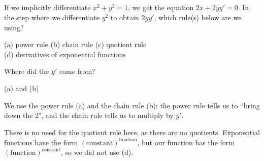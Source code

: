 %
%



\subsection*{\Conceptual}


\begin{question}
If we implicitly differentiate $x^2+y^2=1$, we get the equation $2x+2yy'=0$. In the step where we differentiate $y^2$ to obtain $2yy'$, which rule(s) below are we using?
\begin{center}
(a) power rule \qquad (b) chain rule \qquad
 (c) quotient rule \\(d) derivatives of exponential functions
\end{center}
\end{question}
\begin{hint}
Where did the $y'$ come from?
\end{hint}
\begin{answer}
(a) and (b)
\end{answer}
\begin{solution}
We use the power rule (a) and the chain rule (b): the power rule tells us to ``bring down the 2", and the chain rule tells us to multiply by $y'$. \medskip

There is no need for the quotient rule here, as there are no quotients. Exponential functions have the form $(\mbox{constant})^{\mbox{function}}$, but our function has the form $(\mbox{function})^{\mbox{constant}}$, so we did not use (d).
\end{solution}

